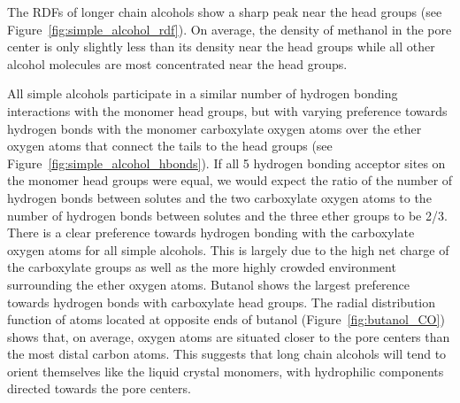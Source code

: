 \documentclass[journal=jpcbfk,manuscript=article]{achemso}
\begin{document}
  The RDFs of longer chain alcohols show a sharp peak near the head groups 
  (see Figure~\ref{fig:simple_alcohol_rdf}). On average, the density of methanol
  in the pore center is only slightly less than its density near the head 
  groups while all other alcohol molecules are most concentrated near the head
  groups.
  
  All simple alcohols participate in a similar number of hydrogen bonding 
  interactions with the monomer head groups, but with varying preference towards
  hydrogen bonds with the monomer carboxylate oxygen atoms over the ether oxygen
  atoms that connect the tails to the head groups (see Figure~\ref{fig:simple_alcohol_hbonds}).
  If all 5 hydrogen bonding acceptor sites on the monomer head groups were equal,
  we would expect the ratio of the number of hydrogen bonds between solutes and
  the two carboxylate oxygen atoms to the number of hydrogen bonds between solutes
  and the three ether groups to be 2/3. There is a clear preference towards 
  hydrogen bonding with the carboxylate oxygen atoms for all simple alcohols. 
  This is largely due to the high net charge of the carboxylate groups as well
  as the more highly crowded environment surrounding the ether oxygen atoms. 
  Butanol shows the largest preference towards hydrogen bonds with carboxylate
  head groups. The radial distribution function of atoms located at opposite ends
  of butanol (Figure~\ref{fig:butanol_CO}) shows that, on average, oxygen atoms are situated closer to the pore
  centers than the most distal carbon atoms. This suggests that long chain alcohols
  will tend to orient themselves like the liquid crystal monomers, with hydrophilic components
  directed towards the pore centers.
  
\end{document}

